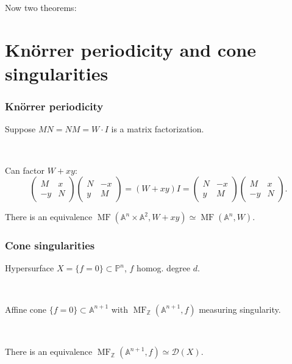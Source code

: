 \documentclass{beamer}
\DeclareMathOperator{\MF}{MF}
\newcommand{\A}{\mathbb{A}}
\newcommand{\Z}{\mathbb{Z}}
\renewcommand{\P}{\mathbb{P}}
\newcommand{\calD}{\mathcal{D}}
\begin{document}
\begin{frame}
    Now two theorems:
\end{frame}

\section{Kn\"orrer periodicity and cone singularities}

\begin{frame}
    \frametitle{Kn\"orrer periodicity}

    Suppose $MN=NM=W\cdot I$ is a matrix factorization. \pause

    ~

    Can factor $W+xy$:
    \begin{equation*}
        \begin{pmatrix}
            M & x \\ -y & N
        \end{pmatrix}\begin{pmatrix}
            N & -x \\ y & M
        \end{pmatrix}
            = (W+xy)I =
        \begin{pmatrix}
            N & -x \\ y & M
        \end{pmatrix}\begin{pmatrix}
            M & x \\ -y & N
        \end{pmatrix}.
    \end{equation*} \pause

    \begin{theorem}
        There is an equivalence $\MF(\A^n\times\A^2,W+xy)\simeq\MF(\A^n,W)$.
    \end{theorem}


\end{frame}

\begin{frame}
    \frametitle{Cone singularities}

    Hypersurface $X=\{f=0\}\subset\P^n$, $f$ homog. degree $d$. \pause

    ~

    Affine cone $\{f=0\}\subset\A^{n+1}$ with $\MF_\Z(\A^{n+1},f)$ measuring
    singularity. \pause

    ~

    \begin{theorem}[Orlov]
        There is an equivalence $\MF_\Z(\A^{n+1},f)\simeq\calD(X)$.
    \end{theorem}


\end{frame}
\end{document}
